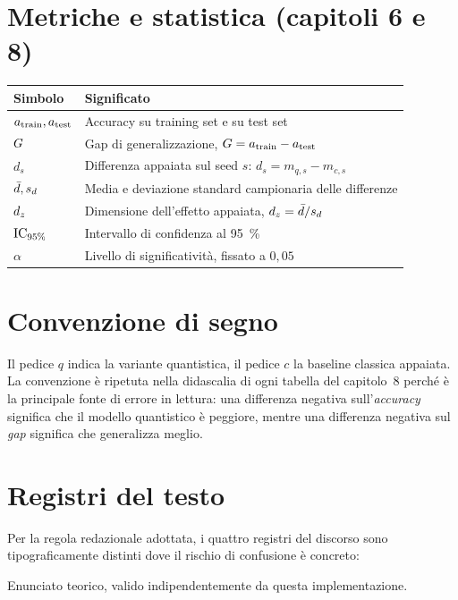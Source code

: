 \section*{Metriche e statistica (capitoli 6 e 8)}

\begin{center}
\begin{tabularx}{\textwidth}{@{}l X@{}}
\toprule
\textbf{Simbolo} & \textbf{Significato} \\
\midrule
$a_{\mathrm{train}}, a_{\mathrm{test}}$ & Accuracy su training set e su test set \\
$G$ & Gap di generalizzazione, $G = a_{\mathrm{train}} - a_{\mathrm{test}}$ \\
$d_s$ & Differenza appaiata sul seed $s$: $d_s = m_{q,s} - m_{c,s}$ \\
$\bar{d}, s_d$ & Media e deviazione standard campionaria delle differenze \\
$d_z$ & Dimensione dell'effetto appaiata, $d_z = \bar{d} / s_d$ \\
$\text{IC}_{95\%}$ & Intervallo di confidenza al \SI{95}{\percent} \\
$\alpha$ & Livello di significatività, fissato a $0{,}05$ \\
\bottomrule
\end{tabularx}
\end{center}

\section*{Convenzione di segno}

\convsegno{} Il pedice $q$ indica la variante quantistica, il pedice $c$ la
baseline classica appaiata. La convenzione è ripetuta nella didascalia di ogni
tabella del capitolo~8 perché è la principale fonte di errore in lettura: una
differenza negativa sull'\emph{accuracy} significa che il modello quantistico è
peggiore, mentre una differenza negativa sul \emph{gap} significa che generalizza
meglio.

\section*{Registri del testo}

Per la regola redazionale adottata, i quattro registri del discorso sono
tipograficamente distinti dove il rischio di confusione è concreto:

\begin{definizione}[Esempio]
Enunciato teorico, valido indipendentemente da questa implementazione.
\end{definizione}

